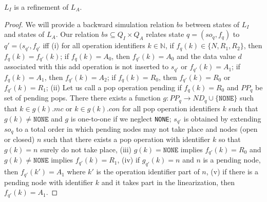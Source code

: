 \begin{lem}
$L_I$ is a refinement of $L_A$.
\end{lem}
\begin{proof}
We will provide a backward simulation relation $bs$ between states of $L_I$ and states of $L_A$. Our relation $bs \subseteq Q_I \times Q_A$ relates state $q=(so_q, f_q)$ to $q' =(s_{q'}, f_{q'}$ iff (i) for all operation identifiers $k \in \mathbb{N}$, if $f_q(k) \in \{N,R_1,R_2\}$, then $f_q(k) = f_{q'}(k)$; if $f_q(k) = A_0$, then $f_{q'}(k) = A_0$ and the data value $d$ associated with this add operation is not inserted to $s_{q'}$ or $f_{q'}(k) = A_1$;  if $f_q(k) = A_1$, then $f_{q'}(k) = A_2$; if $f_q(k) = R_0$, then $f_{q'}(k)=R_0$ or $f_{q'}(k)=R_1$; (ii) Let us call a pop operation pending if $f_{q}(k) = R_0$ and $PP_q$ be set of pending pops. There there exists a function $g: PP_q \rightarrow ND_q \cup \{\texttt{NONE}\}$ such that $k \in g(k).mc$ or $k \in g(k).con$ for all pop operation identifiers $k$ such that $g(k) \neq \texttt{NONE}$ and $g$ is one-to-one if we neglect \texttt{NONE}; $s_{q'}$ is obtained by extending $so_q$ to a total order in which pending nodes may not take place and nodes (open or closed) $n$ such that there exists a pop operation with identifier $k$ so that $g(k)=n$ surely do not take place, (iii) $g(k) = \texttt{NONE}$ implies $f_{q'}(k) = R_0$ and $g(k) \neq \texttt{NONE}$ implies $f_{q'}(k) =R_1$, (iv) if $g_{q'}(k) =n$ and $n$ is a pending node, then $f_{q'}(k') = A_1$ where $k'$ is the operation identifier part of $n$, (v) if there is a pending node with identifier $k$ and it takes part in the linearization, then $f_{q'}(k) = A_1$. 


\end{proof}
